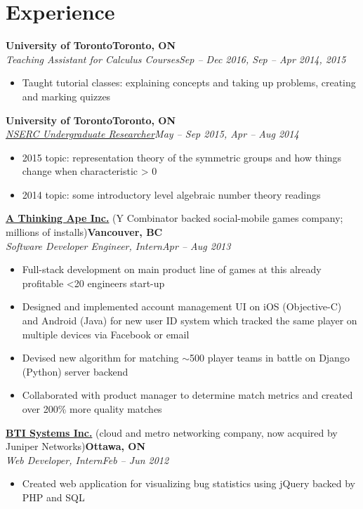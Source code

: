 \documentclass[10pt,letterpaper]{article}
\newcommand*\company[1]{\textbf{#1}}
\newcommand*\position[1]{\textit{#1}}
\newcommand*\location\company
\newcommand*\timespan\position
\begin{document}
\section*{Experience}
\company{University of Toronto}\hfill\location{Toronto, ON}\\
\position{Teaching Assistant for Calculus Courses}\hfill\timespan{Sep -- Dec 2016, Sep -- Apr 2014, 2015}
\begin{itemize}
\item Taught tutorial classes: explaining concepts and taking up problems, creating and marking quizzes
\end{itemize}
\company{University of Toronto}\hfill\location{Toronto, ON}\\
\position{\href{http://www.nserc-crsng.gc.ca/Students-Etudiants/UG-PC/USRA-BRPC_eng.asp}{NSERC Undergraduate Researcher}}\hfill\timespan{May -- Sep 2015, Apr -- Aug 2014}
\begin{itemize}
\item 2015 topic: representation theory of the symmetric groups and how things change when characteristic > 0
\item 2014 topic: some introductory level algebraic number theory readings
\end{itemize}
\company{\href{http://www.athinkingape.com/}{A Thinking Ape Inc.}} (Y Combinator backed social-mobile games company; millions of installs)\hfill\location{Vancouver, BC}\\
\position{Software Developer Engineer, Intern}\hfill\timespan{Apr -- Aug 2013}
\begin{itemize}
\item Full-stack development on main product line of games at this already profitable <20 engineers start-up
\item Designed and implemented account management UI on iOS (Objective-C) and Android (Java) for new user ID system which tracked the same player on multiple devices via Facebook or email
\item Devised new algorithm for matching \(\sim\)500 player teams in battle on Django (Python) server backend
\item Collaborated with product manager to determine match metrics and created over 200\% more quality matches
\end{itemize}
\company{\href{http://www.juniper.net/us/en/dm/bti/}{BTI Systems Inc.}} (cloud and metro networking company, now acquired by Juniper Networks)\hfill\location{Ottawa, ON}\\
\position{Web Developer, Intern}\hfill\timespan{Feb -- Jun 2012}
\begin{itemize}
\item Created web application for visualizing bug statistics using jQuery backed by PHP and SQL
\end{itemize}
\end{document}
